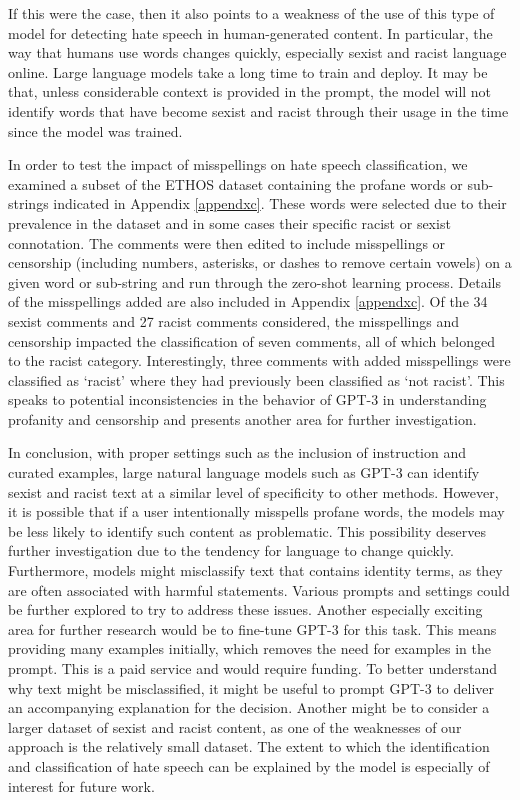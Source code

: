 \documentclass[12pt,]{article}
\begin{document}
If this were the case, then it also points to a weakness of the use of this type of model for detecting hate speech in human-generated content. In particular, the way that humans use words changes quickly, especially sexist and racist language online. Large language models take a long time to train and deploy. It may be that, unless considerable context is provided in the prompt, the model will not identify words that have become sexist and racist through their usage in the time since the model was trained.

In order to test the impact of misspellings on hate speech classification, we examined a subset of the ETHOS dataset containing the profane words or sub-strings indicated in Appendix \ref{appendxc}. These words were selected due to their prevalence in the dataset and in some cases their specific racist or sexist connotation. The comments were then edited to include misspellings or censorship (including numbers, asterisks, or dashes to remove certain vowels) on a given word or sub-string and run through the zero-shot learning process. Details of the misspellings added are also included in Appendix \ref{appendxc}. Of the 34 sexist comments and 27 racist comments considered, the misspellings and censorship impacted the classification of seven comments, all of which belonged to the racist category. Interestingly, three comments with added misspellings were classified as `racist' where they had previously been classified as `not racist'. This speaks to potential inconsistencies in the behavior of GPT-3 in understanding profanity and censorship and presents another area for further investigation.

In conclusion, with proper settings such as the inclusion of instruction and curated examples, large natural language models such as GPT-3 can identify sexist and racist text at a similar level of specificity to other methods. However, it is possible that if a user intentionally misspells profane words, the models may be less likely to identify such content as problematic. This possibility deserves further investigation due to the tendency for language to change quickly. Furthermore, models might misclassify text that contains identity terms, as they are often associated with harmful statements. Various prompts and settings could be further explored to try to address these issues. Another especially exciting area for further research would be to fine-tune GPT-3 for this task. This means providing many examples initially, which removes the need for examples in the prompt. This is a paid service and would require funding. To better understand why text might be misclassified, it might be useful to prompt GPT-3 to deliver an accompanying explanation for the decision. Another might be to consider a larger dataset of sexist and racist content, as one of the weaknesses of our approach is the relatively small dataset. The extent to which the identification and classification of hate speech can be explained by the model is especially of interest for future work.
\end{document}
